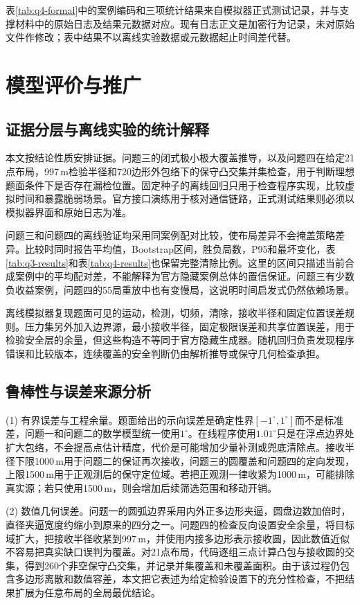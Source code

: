 \documentclass[UTF8,12pt,a4paper]{ctexart}
\numberwithin{equation}{section}
\begin{document}
表\ref{tab:q4-formal}中的案例编码和三项统计结果来自模拟器正式测试记录，并与支撑材料中的原始日志及结果元数据对应。现有日志正文是加密行为记录，未对原始文件作修改；表中结果不以离线实验数据或元数据起止时间差代替。

\section{模型评价与推广}

\subsection{证据分层与离线实验的统计解释}

本文按结论性质安排证据。问题三的闭式极小极大覆盖推导，以及问题四在给定21点布局，997\,m检验半径和720边形外包络下的保守凸交集并集检查，用于判断理想题面条件下是否存在漏检位置。固定种子的离线回归只用于检查程序实现，比较虚拟时间和暴露脆弱场景。官方接口演练用于核对通信链路，正式测试结果则必须以模拟器界面和原始日志为准。

问题三和问题四的离线验证均采用同案例配对比较，使布局差异不会掩盖策略差异。比较时同时报告平均值，Bootstrap区间，胜负局数，P95和最坏变化，表\ref{tab:q3-results}和表\ref{tab:q4-results}也保留完整清除比例。这里的区间只描述当前合成案例中的平均配对差，不能解释为官方隐藏案例总体的置信保证。问题三有少数负收益案例，问题四的55局重放中也有变慢局，这说明时间启发式仍然依赖场景。

离线模拟器复现题面可见的运动，检测，切频，清除，接收半径和固定位置误差规则。压力集另外加入边界源，最小接收半径，固定极限误差和共享位置误差，用于检验安全层的余量，但这些构造不等同于官方隐藏生成器。随机回归负责发现程序错误和比较版本，连续覆盖的安全判断仍由解析推导或保守几何检查承担。

\subsection{鲁棒性与误差来源分析}

(1) 有界误差与工程余量。题面给出的示向误差是确定性界$[-1^\circ,1^\circ]$而不是标准差，问题一和问题二的数学模型统一使用$1^\circ$。在线程序使用$1.01^\circ$只是在浮点边界处扩大包络，不会提高点估计精度，代价是可能增加少量补测或兜底清除点。接收半径下限1000\,m用于问题二的保证再次接收，问题三的圆覆盖和问题四的定向发现，上限1500\,m用于正观测后的保守定位域。若把正观测一律收紧为1000\,m，可能排除真实源；若只使用1500\,m，则会增加后续筛选范围和移动开销。

(2) 数值几何误差。问题一的圆弧边界采用内外正多边形夹逼，圆盘边数加倍时，直径夹逼宽度约缩小到原来的四分之一。问题四的检查反向设置安全余量，将目标域扩大，把接收半径收紧到997\,m，并使用内接多边形表示接收圆，因此数值近似不容易把真实缺口误判为覆盖。对21点布局，代码逐组三点计算凸包与接收圆的交集，得到260个非空保守凸交集，并记录并集覆盖和未覆盖面积。由于该过程仍包含多边形离散和数值容差，本文把它表述为给定检验设置下的充分性检查，不把结果扩展为任意布局的全局最优结论。
\end{document}
